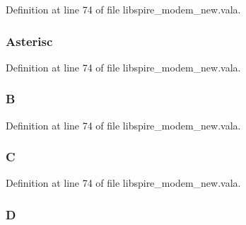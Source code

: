 Definition at line 74 of file libspire\-\_\-modem\-\_\-new.\-vala.

\hypertarget{libspire__modem__new_8vala_a96eda96ce5ad0c1d1b6588690e70b48b}{
\subsubsection[{Asterisc}]{\setlength{\rightskip}{0pt plus 5cm}Asterisc}}\label{libspire__modem__new_8vala_a96eda96ce5ad0c1d1b6588690e70b48b}


Definition at line 74 of file libspire\-\_\-modem\-\_\-new.\-vala.

\hypertarget{libspire__modem__new_8vala_a9d3d9048db16a7eee539e93e3618cbe7}{
\subsubsection[{B}]{\setlength{\rightskip}{0pt plus 5cm}B}}\label{libspire__modem__new_8vala_a9d3d9048db16a7eee539e93e3618cbe7}


Definition at line 74 of file libspire\-\_\-modem\-\_\-new.\-vala.

\hypertarget{libspire__modem__new_8vala_aaa53ca0b650dfd85c4f59fa156f7a2cc}{
\subsubsection[{C}]{\setlength{\rightskip}{0pt plus 5cm}C}}\label{libspire__modem__new_8vala_aaa53ca0b650dfd85c4f59fa156f7a2cc}


Definition at line 74 of file libspire\-\_\-modem\-\_\-new.\-vala.

\hypertarget{libspire__modem__new_8vala_a350bfcb1e3cfb28ddff48ce525d4f139}{
\subsubsection[{D}]{\setlength{\rightskip}{0pt plus 5cm}D}}\label{libspire__modem__new_8vala_a350bfcb1e3cfb28ddff48ce525d4f139}


